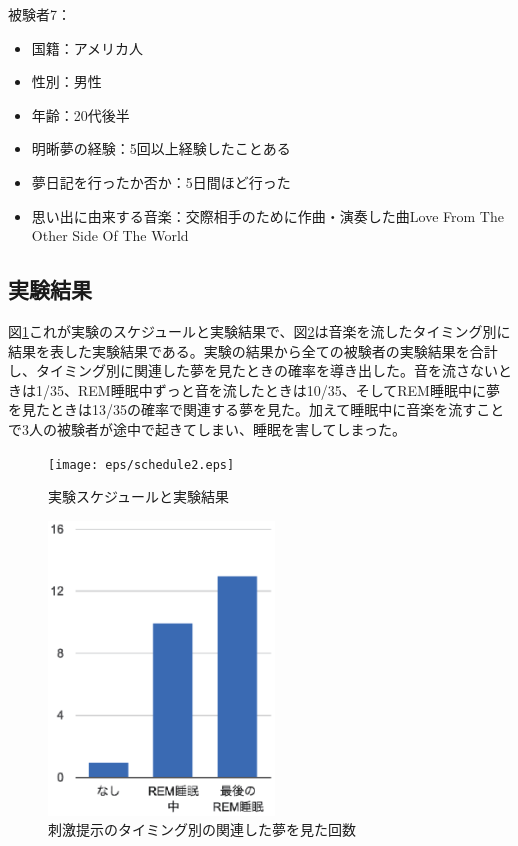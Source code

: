 被験者7：
\begin{itemize}
\item 国籍：アメリカ人
\item 性別：男性
\item 年齢：20代後半
\item 明晰夢の経験：5回以上経験したことある
\item 夢日記を行ったか否か：5日間ほど行った
\item 思い出に由来する音楽：交際相手のために作曲・演奏した曲Love From The Other Side Of The World\end{itemize}

\subsection{実験結果}
図\ref{experiment3}これが実験のスケジュールと実験結果で、図\ref{result}は音楽を流したタイミング別に結果を表した実験結果である。実験の結果から全ての被験者の実験結果を合計し、タイミング別に関連した夢を見たときの確率を導き出した。音を流さないときは1/35、REM睡眠中ずっと音を流したときは10/35、そしてREM睡眠中に夢を見たときは13/35の確率で関連する夢を見た。加えて睡眠中に音楽を流すことで3人の被験者が途中で起きてしまい、睡眠を害してしまった。
\begin{figure}[htbp]
\begin{center}
\texttt{[image: eps/schedule2.eps]}
\caption{実験スケジュールと実験結果}
\label{experiment3}
\end{center}
\end{figure}

\begin{figure}[htbp]
\begin{center}
\includegraphics[width=6cm]{eps/result.eps}
\caption{刺激提示のタイミング別の関連した夢を見た回数}
\label{result}
\end{center}
\end{figure}

